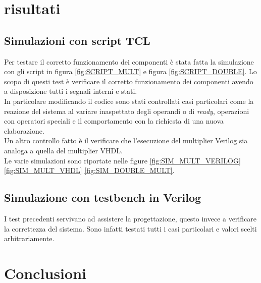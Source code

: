 \documentclass[]{IEEEtran}
\begin{document}
\section{risultati}

\subsection{Simulazioni con script TCL}
Per testare il corretto funzionamento dei componenti è stata fatta la simulazione con gli script in figura \ref{fig:SCRIPT_MULT} e figura \ref{fig:SCRIPT_DOUBLE}. Lo scopo di questi test è verificare il corretto funzionamento dei componenti avendo a disposizione tutti i segnali interni e stati.
\\In particolare modificando il codice sono stati controllati casi particolari come la reazione del sistema al variare inaspettato degli operandi o di \textit{ready}, operazioni con operatori speciali e il comportamento con la richiesta di una nuova elaborazione.
\\Un altro controllo fatto è il verificare che l'esecuzione del multiplier Verilog sia analoga a quella del multiplier VHDL.
\\Le varie simulazioni sono riportate nelle figure \ref{fig:SIM_MULT_VERILOG} \ref{fig:SIM_MULT_VHDL} \ref{fig:SIM_DOUBLE_MULT}.

\subsection{Simulazione con testbench in Verilog}
I test precedenti servivano ad assistere la progettazione, questo invece a verificare la correttezza del sistema. Sono infatti testati tutti i casi particolari e valori scelti arbitrariamente.














\section{Conclusioni}




\appendix
\end{document}
